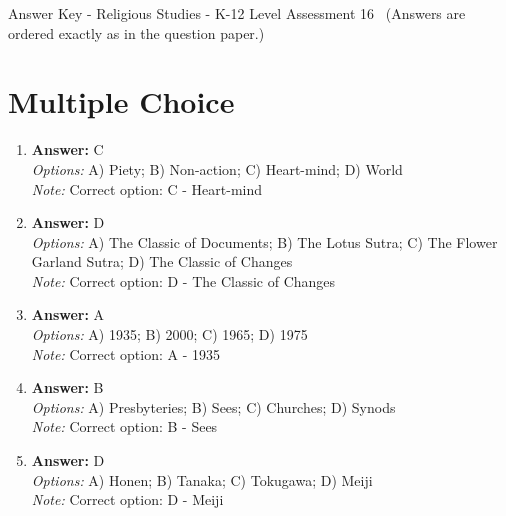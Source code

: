 \documentclass[12pt]{article}
\begin{document}
\begin{center}
Answer Key - Religious Studies - K-12 Level Assessment 16 \
\small (Answers are ordered exactly as in the question paper.)
\end{center}

\section*{Multiple Choice}
\begin{enumerate}[label=\arabic*.]
\item \textbf{Answer:} C
\\ \textit{Options:} A) Piety; B) Non-action; C) Heart-mind; D) World
\\ \textit{Note:} Correct option: C - Heart-mind
\item \textbf{Answer:} D
\\ \textit{Options:} A) The Classic of Documents; B) The Lotus Sutra; C) The Flower Garland Sutra; D) The Classic of Changes
\\ \textit{Note:} Correct option: D - The Classic of Changes
\item \textbf{Answer:} A
\\ \textit{Options:} A) 1935; B) 2000; C) 1965; D) 1975
\\ \textit{Note:} Correct option: A - 1935
\item \textbf{Answer:} B
\\ \textit{Options:} A) Presbyteries; B) Sees; C) Churches; D) Synods
\\ \textit{Note:} Correct option: B - Sees
\item \textbf{Answer:} D
\\ \textit{Options:} A) Honen; B) Tanaka; C) Tokugawa; D) Meiji
\\ \textit{Note:} Correct option: D - Meiji
\end{enumerate}
\end{document}
